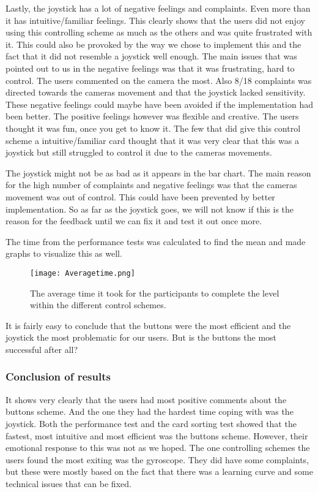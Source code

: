 Lastly, the joystick has a lot of negative feelings and complaints. Even more than it has intuitive/familiar feelings. This clearly shows that the users did not enjoy using this controlling scheme as much as the others and was quite frustrated with it. This could also be provoked by the way we chose to implement this and the fact that it did not resemble a joystick well enough. The main issues that was pointed out to us in the negative feelings was that it was frustrating, hard to control. The users commented on the camera the most. Also 8/18 complaints was directed towards the cameras movement and that the joystick lacked sensitivity. These negative feelings could maybe have been avoided if the implementation had been better. %
The positive feelings however was flexible and creative. The users thought it was fun, once you get to know it. 
The few that did give this control scheme a intuitive/familiar card thought that it was very clear that this was a joystick but still struggled to control it due to the cameras movements.

The joystick might not be as bad as it appears in the bar chart. The main reason for the high number of complaints and negative feelings was that the cameras movement was out of control. This could have been prevented by better implementation. So as far as the joystick goes, we will not know if this is the reason for the feedback until we can fix it and test it out once more.


The time from the performance tests was calculated to find the mean and made graphs to visualize this as well. 

\begin{figure}[H]
\centering
\texttt{[image: Averagetime.png]}
\caption{The average time it took for the participants to complete the level within the different control schemes.}
\end{figure}

It is fairly easy to conclude that the buttons were the most efficient and the joystick the most problematic for our users. But is the buttons the most successful after all?

\subsubsection{Conclusion of results}

It shows very clearly that the users had most positive comments about the buttons scheme. And the one they had the hardest time coping with was the joystick. 
Both the performance test and the card sorting test showed that the fastest, most intuitive and most efficient was the buttons scheme. However, their emotional response to this was not as we hoped. 
The one controlling schemes the users found the most exiting was the gyroscope. They did have some complaints, but these were mostly based on the fact that there was a learning curve and some technical issues that can be fixed. 


